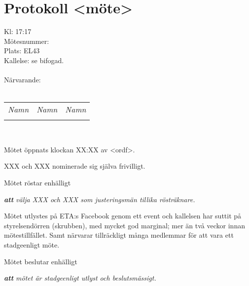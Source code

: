 



\section*{\center Protokoll <möte> \datummote}
Kl: 17:17\\
Mötesnummer: \nr \ \verksamhetsar\\
Plats: EL43\\
Kallelse: se bifogad.\\ \\
Närvarande:\\ \\

\begin{tabular}{l l l}
\itshape Namn & \itshape Namn & \itshape Namn\\
  & & \\

\end{tabular}\\


Mötet öppnats klockan XX:XX av <ordf>.



XXX och XXX nominerade sig själva frivilligt.

Mötet röstar enhälligt

\emph{\textbf{att} välja XXX och XXX som justeringsmän tillika rösträknare.}





Mötet utlystes på ETA:s Facebook genom ett event och kallelsen har suttit på styrelsendörren (skrubben), med mycket god marginal; mer än två veckor innan mötestillfället. Samt närvarar tillräckligt många medlemmar för att vara ett stadgeenligt möte.

Mötet beslutar enhälligt

\emph{\textbf{att} mötet är stadgeenligt utlyst och beslutsmässigt.}





